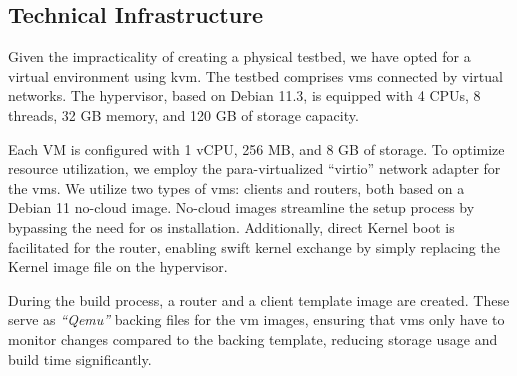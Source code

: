 

\subsection{Technical Infrastructure} %
\label{sub:Technical Infrastructure}
Given the impracticality of creating a physical testbed, we have opted for a 
    virtual environment using \gls{kvm}.
The testbed comprises \glspl{vm} connected by virtual networks.
The hypervisor, based on Debian 11.3, is equipped with 4 CPUs, 8 threads, 32 GB
    memory, and 120 GB of storage capacity.

Each VM is configured with 1 vCPU, 256 MB, and 8 GB of storage.
To optimize resource utilization, we employ the para-virtualized ``virtio''
    network adapter for the \glspl{vm}.
We utilize two types of \glspl{vm}: clients and routers, both based on a Debian
    11 no-cloud image.
No-cloud images streamline the setup process by bypassing the need for \gls{os}
    installation.
Additionally, direct Kernel boot is facilitated for the router, enabling swift
    kernel exchange by simply replacing the Kernel image file on the
    hypervisor.

During the build process, a router and a client template image are created.
These serve as \textit{``Qemu''} backing files for the \gls{vm} images,
    ensuring that \glspl{vm} only have to monitor changes compared to the
    backing template, reducing storage usage and build time significantly.

